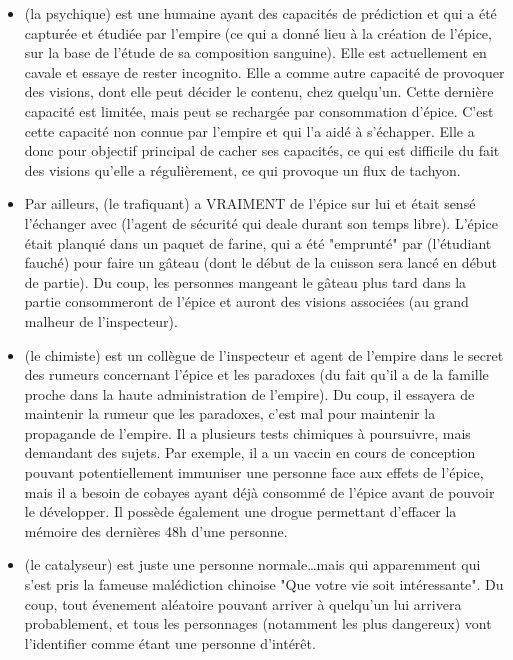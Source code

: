 {\begin{itemize}
		\item \nmPlayerIX (la psychique) est une humaine ayant des capacités de prédiction et qui a été capturée et étudiée par l'empire (ce qui a donné lieu à la création de l'épice, sur la base de l'étude de sa composition sanguine). Elle est actuellement en cavale et essaye de rester incognito. Elle a comme autre capacité de provoquer des visions, dont elle peut décider le contenu, chez quelqu'un. Cette dernière capacité est limitée, mais peut se rechargée par consommation d'épice. C'est cette capacité non connue par l'empire et qui l'a aidé à s'échapper. Elle a donc pour objectif principal de cacher ses capacités, ce qui est difficile du fait des visions qu'elle a régulièrement, ce qui provoque un flux de tachyon.
		
		\item Par ailleurs, \nmPlayerII (le trafiquant) a VRAIMENT de l'épice sur lui et était sensé l'échanger avec \nmPlayerVIII (l'agent de sécurité qui deale durant son temps libre). L'épice était planqué dans un paquet de farine, qui a été "emprunté" par \nmPlayerIII (l'étudiant fauché) pour faire un gâteau (dont le début de la cuisson sera lancé en début de partie). Du coup, les personnes mangeant le gâteau plus tard dans la partie consommeront de l'épice et auront des visions associées (au grand malheur de l'inspecteur).
		
		\item \nmPlayerXII (le chimiste) est un collègue de l'inspecteur et agent de l'empire dans le secret des rumeurs concernant l'épice et les paradoxes (du fait qu'il a de la famille proche dans la haute administration de l'empire). Du coup, il essayera de maintenir la rumeur que les paradoxes, c'est mal pour maintenir la propagande de l'empire. Il a plusieurs tests chimiques à poursuivre, mais demandant des sujets. Par exemple, il a un vaccin en cours de conception pouvant potentiellement immuniser une personne face aux effets de l'épice, mais il a besoin de cobayes ayant déjà consommé de l'épice avant de pouvoir le développer. Il possède également une drogue permettant d'effacer la mémoire des dernières 48h d'une personne.
		
		\item \nmPlayerXI (le catalyseur) est juste une personne normale\dots mais qui apparemment qui s'est pris la fameuse malédiction chinoise "Que votre vie soit intéressante". Du coup, tout évenement aléatoire pouvant arriver à quelqu'un lui arrivera probablement, et tous les personnages (notamment les plus dangereux) vont l'identifier comme étant une personne d'intérêt.
		

\end{itemize}}
